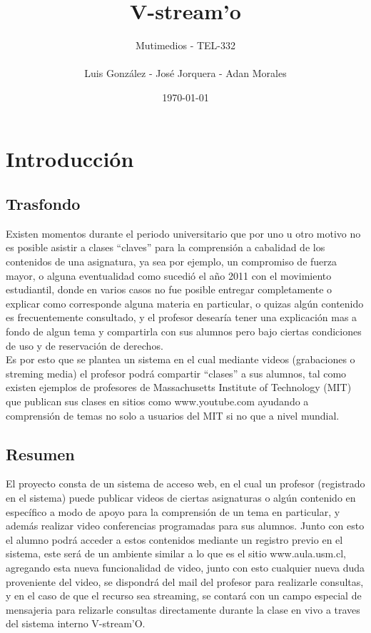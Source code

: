 \documentclass[12pt]{article}
\title{V-stream'o}
\author{Mutimedios - TEL-332\\\\Luis González - José Jorquera - Adan Morales}
\date{\today}
\begin{document}
\maketitle
\thispagestyle{empty}

\newpage
\section{Introducción}
\subsection{Trasfondo}
Existen momentos durante el periodo universitario que por uno u otro motivo no es posible asistir a clases 
``claves'' para la comprensión a cabalidad de los contenidos de una asignatura, ya sea por ejemplo, un 
compromiso de fuerza mayor, o alguna eventualidad como sucedió el a\~no 2011 con el movimiento estudiantil, 
donde en varios casos no fue posible entregar completamente o explicar como corresponde alguna materia 
en particular, o quizas algún contenido es frecuentemente consultado, y el profesor desearía tener una 
explicación mas a fondo de algun tema y compartirla con sus alumnos pero bajo ciertas condiciones de uso
y de reservación de derechos.\\

Es por esto que se plantea un sistema en el cual mediante videos (grabaciones o streming media) el profesor
podrá compartir ``clases'' a sus alumnos, tal como existen ejemplos de profesores de Massachusetts Institute 
of Technology (MIT) que publican sus clases en sitios como www.youtube.com ayudando a comprensión de temas
no solo a usuarios del MIT si no que a nivel mundial.

\subsection{Resumen}
El proyecto consta de un sistema de acceso web, en el cual un profesor (registrado en el sistema) puede 
publicar videos de ciertas asignaturas o algún contenido en específico a modo de apoyo para la comprensión
de un tema en particular, y además realizar video conferencias programadas para sus alumnos. Junto con esto
el alumno podrá acceder a estos contenidos mediante un registro previo en el sistema,
este será de un ambiente similar a lo que es el sitio www.aula.usm.cl, agregando esta nueva
funcionalidad de video, junto con esto cualquier nueva duda proveniente del video, se dispondrá del mail 
del profesor para realizarle consultas, y en el caso de que el recurso sea streaming, se contará con un campo
especial de mensajeria para relizarle consultas directamente durante la clase en vivo a traves del sistema
interno V-stream'O.
\end{document}
